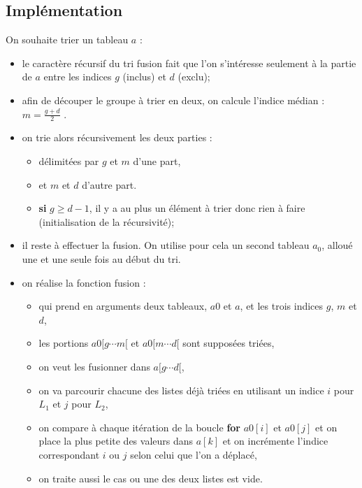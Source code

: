 \subsection{Implémentation}


On souhaite trier un tableau $a$ :
\begin{itemize}
\item le caractère récursif du tri fusion fait que l'on s'intéresse seulement à la partie de $a$ entre les indices $g$ (inclus) et $d$ (exclu);
\item afin de découper le groupe à trier en deux, on calcule l'indice médian :
$m = \frac{g+d}{2}$ . 

\item on trie alors récursivement les deux parties :
\begin{itemize}
\item délimitées par $g$ et $m$ d'une part,
\item et $m$ et $d$ d'autre part.
\item \textbf{si} \textbf{$g\geq d-1$}, il y a au plus un élément à trier donc rien à faire (initialisation de la récursivité);
\end{itemize}


%		


\item il reste à effectuer la fusion. On utilise pour cela un second tableau $a_0$, alloué une et une seule fois au
début du tri.
\item on réalise la fonction fusion :
\begin{itemize}
\item qui prend en arguments deux tableaux, $a0$ et $a$, et les trois indices $g$, $m$ et $d$,
\item les portions $a0[g \cdots  m[$ et $a0[m \cdots d[$ sont supposées triées,
\item on veut les fusionner dans $a[g\cdots d[$,
\item on va parcourir chacune des listes déjà triées en utilisant un indice $i$ pour $L_1$ et $j$ pour $L_2$,
\item on compare à chaque itération de la boucle \textbf{for} $a0[i]$ et $a0[j]$ et on place la plus petite des valeurs dans $a[k]$ et on incrémente l'indice correspondant $i$ ou $j$ selon celui que l'on a déplacé,
\item on traite aussi le cas ou une des deux listes est vide.
\end{itemize}


%		


\end{itemize}
%


